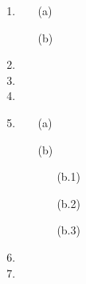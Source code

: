 \documentclass[11pt]{article}
\begin{document}
\begin{enumerate}
\begin{enumerate}
            \item[(d)]
                
        \end{enumerate}
    \item %
        \begin{enumerate}
            \item[(a)]
                
            \item[(b)]
        \end{enumerate}
    \item
    \item
    \item
    \item %
        \begin{enumerate}
            \item[(a)]

            \item[(b)]
                \begin{enumerate}
                    \item[(b.1)]
                    \item[(b.2)]
                    \item[(b.3)]
                \end{enumerate}
        \end{enumerate}
    \item
    \item
\end{enumerate}
\end{document}
